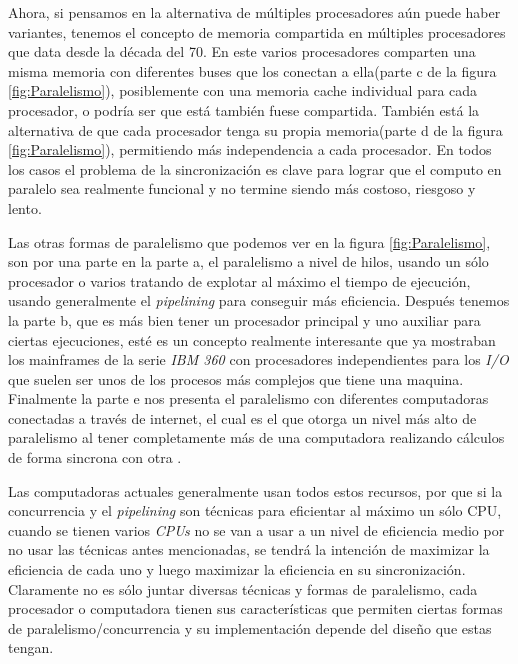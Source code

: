 \documentclass[letterpaper,12pt,oneside]{book}
\begin{document}
		Ahora, si pensamos en la alternativa de múltiples procesadores aún puede haber variantes, tenemos el concepto de memoria compartida
		en múltiples procesadores que data desde la década del 70. En este varios procesadores comparten una misma memoria con diferentes
		buses que los conectan a ella(parte c de la figura \ref{fig:Paralelismo}), posiblemente con una memoria cache individual para cada procesador, o 
		podría ser
		que está también fuese compartida. También está la alternativa de que cada procesador tenga su propia memoria(parte d de la figura 
		\ref{fig:Paralelismo}), permitiendo más independencia
		a cada procesador. En todos los casos el problema de la sincronización es clave para lograr que el computo en paralelo sea realmente funcional
		y no termine siendo más costoso, riesgoso y lento\cite{null_essentials_2003}.
		
		Las otras formas de paralelismo que podemos ver en la figura \ref{fig:Paralelismo}, son por una parte en la parte a, el paralelismo
		a nivel de hilos, usando un sólo procesador o varios tratando de explotar al máximo el tiempo de ejecución, usando generalmente el 	
		\textit{pipelining} para conseguir más eficiencia. Después tenemos la parte b, que es más
		bien tener un procesador principal y uno auxiliar para ciertas ejecuciones, esté es un concepto realmente interesante que ya mostraban
		los mainframes de la serie \textit{IBM 360} con procesadores independientes para los \textit{I/O} que suelen ser unos de los procesos más
		complejos que tiene una maquina. Finalmente la parte e nos presenta el paralelismo
		con diferentes computadoras conectadas a través de internet, el cual es el que otorga un nivel más alto de paralelismo al tener completamente
		más de una computadora realizando cálculos de forma sincrona con otra \cite{tanenbaum_structured_2013}.

		
		Las computadoras actuales generalmente usan todos estos recursos, por que si la concurrencia y el \textit{pipelining} son técnicas
		para eficientar al máximo un sólo CPU, cuando se tienen varios \textit{CPUs} no se van a usar a un nivel de eficiencia medio por no
		usar las técnicas antes mencionadas, se tendrá la intención de maximizar la eficiencia de cada uno y luego maximizar la eficiencia
		en su sincronización. Claramente no es sólo juntar diversas técnicas y formas de paralelismo, cada procesador o computadora
		tienen sus características que permiten ciertas formas de paralelismo/concurrencia y su implementación depende del diseño que estas
		tengan\cite{tanenbaum_structured_2013}.
\end{document}
